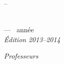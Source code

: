 
\begin{center}
\sffamily\large
\ecole\\
\entite\\
\entiteadresse\\
\entitetel{} – \entitemail
\end{center}

\vfill

\begin{center}
\sffamily\huge
\cours\\
\bigskip
\Large
\etude{} --- \annee\ année\\
\textit{Édition 2013–2014}
\end{center}


\vfill

{\itshape Professeurs\\\auteur}

\setcounter{tocdepth}{1}
\tableofcontents
